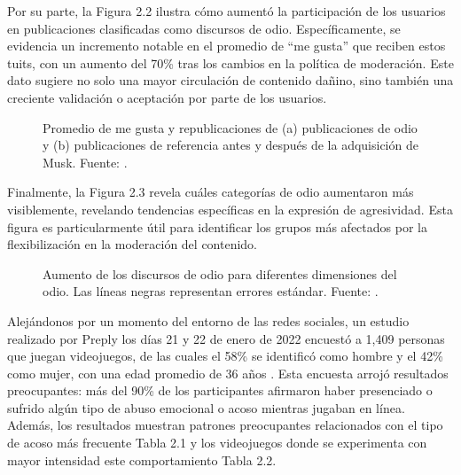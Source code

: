 Por su parte, la Figura 2.2 ilustra cómo aumentó la participación de los usuarios en publicaciones clasificadas como discursos de odio. Específicamente, se evidencia un incremento notable en el promedio de “me gusta” que reciben estos tuits, con un aumento del 70\% tras los cambios en la política de moderación. Este dato sugiere no solo una mayor circulación de contenido dañino, sino también una creciente validación o aceptación por parte de los usuarios.












\vspace{0.5cm}

\begin{figure}[h!]
    \centering
    \caption{Promedio de me gusta y republicaciones de (a) publicaciones de odio y (b) publicaciones de referencia antes y después de la adquisición de Musk. Fuente: \cite{hickey2025x}.}
\end{figure}

Finalmente, la Figura 2.3 revela cuáles categorías de odio aumentaron más visiblemente, revelando tendencias específicas en la expresión de agresividad. Esta figura es particularmente útil para identificar los grupos más afectados por la flexibilización en la moderación del contenido.

\begin{figure}[h!]
    \centering
    \caption{Aumento de los discursos de odio para diferentes dimensiones del odio. Las líneas negras representan errores estándar. Fuente: \cite{hickey2025x}.}
\end{figure}

Alejándonos por un momento del entorno de las redes sociales, un estudio realizado por Preply los días 21 y 22 de enero de 2022 encuestó a 1,409 personas que juegan videojuegos, de las cuales el 58\% se identificó como hombre y el 42\% como mujer, con una edad promedio de 36 años \cite{preply2022games}. Esta encuesta arrojó resultados preocupantes: más del 90\% de los participantes afirmaron haber presenciado o sufrido algún tipo de abuso emocional o acoso mientras jugaban en línea. Además, los resultados muestran patrones preocupantes relacionados con el tipo de acoso más frecuente Tabla 2.1 y los videojuegos donde se experimenta con mayor intensidad este comportamiento Tabla 2.2.








